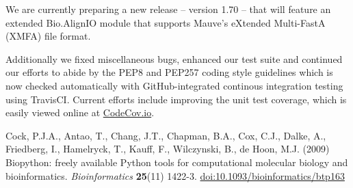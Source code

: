 \documentclass[10pt,oneside]{article}
\begin{document}
We are currently preparing a new release -- version 1.70 -- that will feature an
extended Bio.AlignIO module that supports Mauve's eXtended Multi-FastA (XMFA) file format.

Additionally we fixed miscellaneous bugs, enhanced our test suite and continued our
efforts to abide by the PEP8 and PEP257 coding style guidelines which is now checked
automatically with GitHub-integrated continous integration testing using TravisCI.
Current efforts include improving the unit test coverage, which is easily viewed
online at \href{https://codecov.io/github/biopython/biopython/}{CodeCov.io}.

\begin{thebibliography}{}

Cock, P.J.A., Antao, T., Chang, J.T., Chapman, B.A., Cox, C.J., Dalke, A., Friedberg, I., Hamelryck, T., Kauff, F., Wilczynski, B., de Hoon, M.J. (2009) Biopython: freely available Python tools for computational molecular biology and bioinformatics. {\it Bioinformatics} {\bf 25}(11) 1422-3. \href{http://dx.doi.org/10.1093/bioinformatics/btp163}{doi:10.1093/bioinformatics/btp163}

\end{thebibliography}
\end{document}
